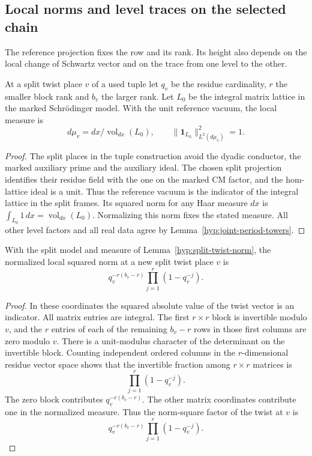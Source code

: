 \subsection{Local norms and level traces on the selected chain}
\label{subsec:selected-norms}

The reference projection fixes the row and its rank. Its height also depends on the local change of Schwartz vector and on the trace from one level to the other.

\begin{established}\label{hyp:split-twist-norm}
At a split twist place \(v\) of a used tuple let \(q_v\) be the residue
cardinality, \(r\) the smaller block rank and \(b_v\) the larger rank.
Let \(L_0\) be the integral matrix lattice in the marked Schr\"odinger
model. With the unit reference vacuum, the local measure is
\[
 d\mu_v=dx/\operatorname{vol}_{dx}(L_0),\qquad
             \|\mathbf1_{L_0}\|_{L^2(d\mu_v)}^2=1 .
\]
\end{established}
\begin{proof}
The split places in the tuple construction avoid the dyadic
conductor, the marked auxiliary prime and the auxiliary ideal.
The chosen split projection identifies their residue field with the
one on the marked CM factor, and the hom-lattice ideal is a unit.
Thus the reference vacuum is the indicator of the integral lattice
in the split frames. Its squared norm for any Haar measure \(dx\) is
\(\int_{L_0}1\,dx=\operatorname{vol}_{dx}(L_0)\). Normalizing this norm
fixes the stated measure. All other level factors and all real data
agree by Lemma~\ref{hyp:joint-period-towers}.
\end{proof}

\begin{lemma}\label{lem:split-twist-norm}
With the split model and measure of
Lemma~\ref{hyp:split-twist-norm}, the normalized local squared norm at a new split
twist place \(v\) is
\[
 q_v^{-r(b_v-r)}\prod_{j=1}^r(1-q_v^{-j}).
\]
\end{lemma}

\begin{proof}
In these coordinates the squared absolute value of the
twist vector is an indicator. All matrix entries are
integral. The first \(r\times r\) block is invertible
modulo \(v\), and the \(r\) entries of each of the
remaining \(b_v-r\) rows in those first columns are zero
modulo \(v\). There is a unit-modulus character of the
determinant on the invertible block. Counting independent
ordered columns in the \(r\)-dimensional residue vector
space shows that the invertible fraction among \(r\times r\)
matrices is
\[
             \prod_{j=1}^r(1-q_v^{-j}).
\]
The zero block contributes \(q_v^{-r(b_v-r)}\).
The other matrix coordinates contribute one in the
normalized measure. Thus the norm-square factor of the
twist at \(v\) is
\begin{equation}\label{eq:selected-twist-norm}
         q_v^{-r(b_v-r)}\prod_{j=1}^r(1-q_v^{-j}).
\end{equation}
\end{proof}

